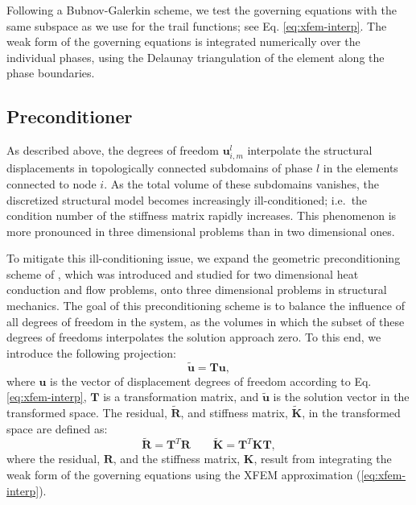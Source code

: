 Following a Bubnov-Galerkin scheme, we test the governing equations with the same subspace as we use for the trail functions; see Eq. \ref{eq:xfem-interp}. The weak form of the governing equations is integrated numerically over the individual phases, using the Delaunay triangulation of the element along the phase boundaries.


\subsection{Preconditioner}
\label{sec:preconditioner}

As described above, the degrees of freedom $\mathbf{u}^l_{i,m}$ interpolate the structural displacements in topologically connected subdomains of phase $l$ in the elements connected to node $i$. As the total volume of these subdomains vanishes, the discretized structural model becomes increasingly ill-conditioned; i.e.~the condition number of the stiffness matrix rapidly increases. This phenomenon is more pronounced in three dimensional problems than in two dimensional ones.

To mitigate this ill-conditioning issue, we expand the geometric preconditioning scheme of \citet{LMD+:13}, which was introduced and studied for two dimensional heat conduction and flow problems, onto three dimensional problems in structural mechanics. The goal of this preconditioning scheme is to balance the influence of all degrees of freedom in the system, as the volumes in which the subset of these degrees of freedoms interpolates the solution approach zero. To this end, we introduce the following projection:
%
\begin{equation}
\label{eqn:preconditioner-u}
	\tilde{\mathbf{u}} = \pmb{T} \mathbf{u},
\end{equation}
%
where $\mathbf{u}$ is the vector of displacement degrees of freedom according to Eq. \ref{eq:xfem-interp}, $\pmb{T}$ is a transformation matrix,  and $\tilde{\mathbf{u}}$ is the solution vector in the transformed space. The residual, $\tilde{\pmb{R}}$, and stiffness matrix, $\tilde{\pmb{K}}$, in the transformed space are defined as:
%
\begin{equation}
\label{eqn:preconditioner-residual}
	\tilde{\pmb{R}} = \pmb{T}^{T} \pmb{R}  \qquad 	\tilde{\pmb{K}} = \pmb{T}^{T} \pmb{K} \pmb{T},
\end{equation}
%
where the residual, $\pmb{R}$, and the stiffness matrix, $\pmb{K}$, result from integrating the weak form of the governing equations using the XFEM approximation (\ref{eq:xfem-interp}).

